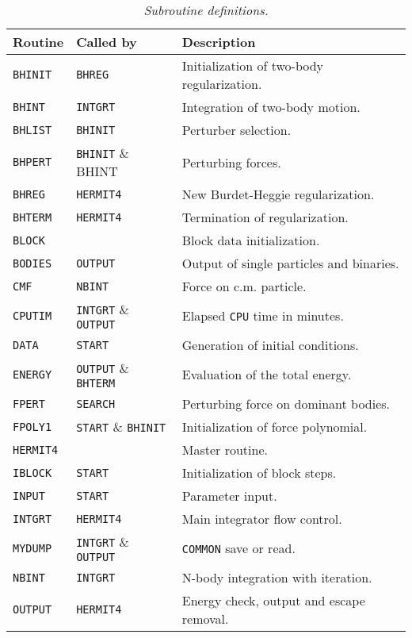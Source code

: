\documentclass[12pt]{article}
\begin{document}
\begin{table}[h]
\vspace*{-5mm}
\centering
\caption{{\it Subroutine definitions.}}
\label{routines}
\begin{tabular}{lll}
\hline\hline
\multicolumn{1}{l}{Routine} &
\multicolumn{1}{l}{Called by} &
\multicolumn{1}{l}{Description} \\
\hline\hline
{\tt BHINIT} & {\tt BHREG} &Initialization of two-body regularization. \\
{\tt BHINT}  & {\tt INTGRT} &Integration of two-body motion. \\
{\tt BHLIST} & {\tt BHINIT} &Perturber selection. \\
{\tt BHPERT} & {\tt BHINIT} \& BHINT &Perturbing forces. \\
{\tt BHREG}  & {\tt HERMIT4} &New Burdet-Heggie regularization. \\
{\tt BHTERM} & {\tt HERMIT4} &Termination of regularization. \\
{\tt BLOCK}  & &Block data initialization. \\
{\tt BODIES} & {\tt OUTPUT} &Output of single particles and binaries. \\
{\tt CMF}    & {\tt NBINT}  &Force on c.m. particle. \\
{\tt CPUTIM} & {\tt INTGRT} \& {\tt OUTPUT} &Elapsed {\tt CPU} time in minutes. \\
{\tt DATA}   & {\tt START}  &Generation of initial conditions. \\
{\tt ENERGY} & {\tt OUTPUT} \& {\tt BHTERM} &Evaluation of the total energy. \\
{\tt FPERT}  & {\tt SEARCH} &Perturbing force on dominant bodies. \\
{\tt FPOLY1} & {\tt START}  \& {\tt BHINIT} &Initialization of force polynomial. \\
{\tt HERMIT4} & &Master routine. \\
{\tt IBLOCK} & {\tt START} &Initialization of block steps. \\
{\tt INPUT}  & {\tt START} &Parameter input. \\
{\tt INTGRT} & {\tt HERMIT4} &Main integrator flow control. \\
{\tt MYDUMP} & {\tt INTGRT} \& {\tt OUTPUT} &{\tt COMMON} save or read. \\
{\tt NBINT}  & {\tt INTGRT} &N-body integration with iteration. \\
{\tt OUTPUT} & {\tt HERMIT4} &Energy check, output and escape removal. \\

\end{tabular}
\end{table}
\end{document}
